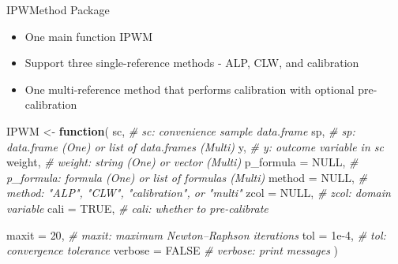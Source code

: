 \documentclass[
  ignorenonframetext,
]{beamer}
\newenvironment{Shaded}{\begin{snugshade}}{\end{snugshade}}
\newcommand{\AttributeTok}[1]{\textcolor[rgb]{0.13,0.29,0.53}{#1}}
\newcommand{\CommentTok}[1]{\textcolor[rgb]{0.56,0.35,0.01}{\textit{#1}}}
\newcommand{\ConstantTok}[1]{\textcolor[rgb]{0.56,0.35,0.01}{#1}}
\newcommand{\ControlFlowTok}[1]{\textcolor[rgb]{0.13,0.29,0.53}{\textbf{#1}}}
\newcommand{\DecValTok}[1]{\textcolor[rgb]{0.00,0.00,0.81}{#1}}
\newcommand{\FloatTok}[1]{\textcolor[rgb]{0.00,0.00,0.81}{#1}}
\newcommand{\NormalTok}[1]{#1}
\newcommand{\OtherTok}[1]{\textcolor[rgb]{0.56,0.35,0.01}{#1}}
\providecommand{\tightlist}{%
  \setlength{\itemsep}{0pt}\setlength{\parskip}{0pt}}
\begin{document}
\begin{frame}[fragile]{IPWMethod Package}
\label{ipwmethod-package}
\begin{itemize}
\tightlist
\item
  One main function IPWM\\
\item
  Support three single-reference methods - ALP, CLW, and calibration\\
\item
  One multi-reference method that performs calibration with optional
  pre-calibration
\end{itemize}

\begin{Shaded}
\begin{Highlighting}[]
\NormalTok{IPWM }\OtherTok{\textless{}{-}} \ControlFlowTok{function}\NormalTok{(}
\NormalTok{    sc,                          }\CommentTok{\# sc: convenience sample data.frame}
\NormalTok{    sp,                          }\CommentTok{\# sp: data.frame (One) or list of data.frames (Multi)}
\NormalTok{    y,                           }\CommentTok{\# y: outcome variable in sc}
\NormalTok{    weight,                      }\CommentTok{\# weight: string (One) or vector (Multi)}
    \AttributeTok{p\_formula =} \ConstantTok{NULL}\NormalTok{,            }\CommentTok{\# p\_formula: formula (One) or list of formulas (Multi)}
    \AttributeTok{method =} \ConstantTok{NULL}\NormalTok{,               }\CommentTok{\# method: "ALP", "CLW", "calibration", or "multi"}
    \AttributeTok{zcol =} \ConstantTok{NULL}\NormalTok{,                 }\CommentTok{\# zcol: domain variable}
    \AttributeTok{cali =} \ConstantTok{TRUE}\NormalTok{,                 }\CommentTok{\# cali: whether to pre{-}calibrate}
    
    
    \AttributeTok{maxit =} \DecValTok{20}\NormalTok{,                  }\CommentTok{\# maxit: maximum Newton–Raphson iterations}
    \AttributeTok{tol =} \FloatTok{1e{-}4}\NormalTok{,                  }\CommentTok{\# tol: convergence tolerance}
    \AttributeTok{verbose =} \ConstantTok{FALSE}              \CommentTok{\# verbose: print messages}
\NormalTok{)}
\end{Highlighting}
\end{Shaded}
\end{frame}
\end{document}

